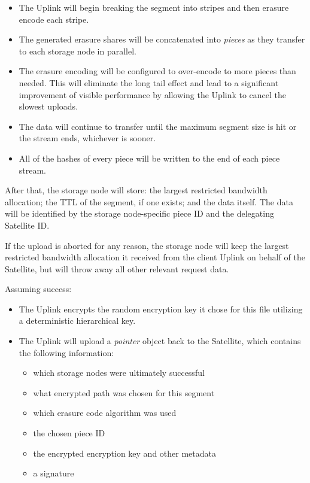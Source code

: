 \documentclass[8pt,fleqn,openany]{book}
\begin{document}
\begin{itemize}
\item The Uplink will begin breaking the segment into stripes and then
  erasure encode each stripe.
\item The generated erasure shares will be concatenated into {\em pieces} as they
  transfer to each storage node in parallel.
\item The erasure encoding will be configured to over-encode to more pieces
  than needed. This will eliminate the long tail effect and lead to a
  significant improvement of visible performance by allowing the Uplink to
  cancel the slowest uploads.
\item The data will continue to transfer until the maximum segment size is hit
  or the stream ends, whichever is sooner.
\item All of the hashes of every piece will be written to the end of each
  piece stream.
\end{itemize}

After that, the storage node will store: the largest restricted bandwidth allocation;
the TTL of the segment, if one exists; and the data itself. The data will
be identified by the storage node-specific piece ID and the delegating Satellite
ID.

If the upload is aborted for any reason, the storage node will keep the
largest restricted bandwidth allocation it received from the client Uplink on
behalf of the Satellite, but will throw away all other relevant request data.

Assuming success:

\begin{itemize}
\item The Uplink encrypts the random encryption key it chose for this file
  utilizing a deterministic hierarchical key.
\item The Uplink will upload a {\em pointer} object back to the Satellite, which
  contains the following information:
  \begin{itemize}
  \item which storage nodes were ultimately successful
  \item what encrypted path was chosen for this segment
  \item which erasure code algorithm was used
  \item the chosen piece ID
  \item the encrypted encryption key and other metadata
  \item a signature
  \end{itemize}
\end{itemize}
\end{document}
